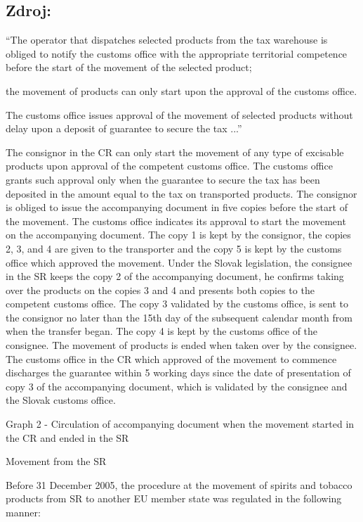 \documentclass[10pt]{article}
\begin{document}
\subsection*{Zdroj:}



“The operator that dispatches selected products from the tax warehouse is obliged to notify the customs office with the appropriate territorial competence before the start of the movement of the selected product;

the movement of products can only start upon the approval of the customs office.


The customs office issues approval of the movement of selected products without delay upon a deposit of guarantee to secure the tax ...”

The consignor in the CR can only start the movement of any type of excisable products upon approval of the competent customs office.
The customs office grants such approval only when the guarantee to secure the tax has been deposited in the amount equal to the tax on transported products.
The consignor is obliged to issue the accompanying document in five copies before the start of the movement.
The customs office indicates its approval to start the movement on the accompanying document.
The copy 1 is kept by the consignor, the copies 2, 3, and 4 are given to the transporter and the copy 5 is kept by the customs office which approved the movement.
Under the Slovak legislation, the consignee in the SR keeps the copy 2 of the accompanying document, he confirms taking over the products on the copies 3 and 4 and presents both copies to the competent customs office.
The copy 3 validated by the customs office, is sent to the consignor no later than the 15th day of the subsequent calendar month from when the transfer began.
The copy 4 is kept by the customs office of the consignee.
The movement of products is ended when taken over by the consignee.
The customs office in the CR which approved of the movement to commence discharges the guarantee within 5 working days since the date of presentation of copy 3 of the accompanying document, which is validated by the consignee and the Slovak customs office.


Graph 2 - Circulation of accompanying document when the movement started in the CR and ended in the SR



Movement from the SR



Before 31 December 2005, the procedure at the movement of spirits and tobacco products from SR to another EU member state was regulated in the following manner:
\end{document}
